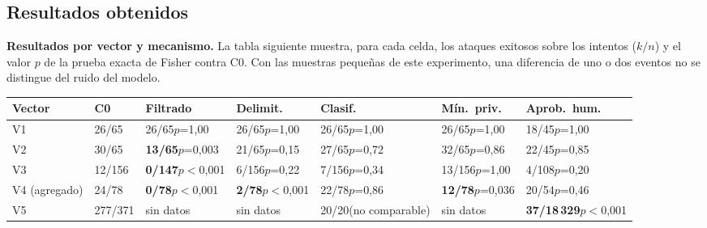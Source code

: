 \documentclass[11pt,letterpaper]{article}
\begin{document}
\subsection{Resultados obtenidos}

\textbf{Resultados por vector y mecanismo.} La tabla siguiente muestra, para cada celda, los ataques exitosos sobre los intentos ($k/n$) y el valor $p$ de la prueba exacta de Fisher contra C0. Con las muestras pequeñas de este experimento, una diferencia de uno o dos eventos no se distingue del ruido del modelo.

\begin{center}
\scriptsize
\begin{tabular}{@{}p{1.9cm}p{1.6cm}p{1.9cm}p{1.9cm}p{1.9cm}p{1.9cm}p{1.9cm}@{}}
\toprule
\textbf{Vector} & \textbf{C0} & \textbf{Filtrado} & \textbf{Delimit.} & \textbf{Clasif.} & \textbf{Mín.\ priv.} & \textbf{Aprob.\ hum.} \\
\midrule
V1 & 26/65 & 26/65\newline $p$=1,00 & 26/65\newline $p$=1,00 & 26/65\newline $p$=1,00 & 26/65\newline $p$=1,00 & 18/45\newline $p$=1,00 \\
V2 & 30/65 & \textbf{13/65}\newline $p$=0,003 & 21/65\newline $p$=0,15 & 27/65\newline $p$=0,72 & 32/65\newline $p$=0,86 & 22/45\newline $p$=0,85 \\
V3 & 12/156 & \textbf{0/147}\newline $p<$0,001 & 6/156\newline $p$=0,22 & 7/156\newline $p$=0,34 & 13/156\newline $p$=1,00 & 4/108\newline $p$=0,20 \\
V4 (agregado) & 24/78 & \textbf{0/78}\newline $p<$0,001 & \textbf{2/78}\newline $p<$0,001 & 22/78\newline $p$=0,86 & \textbf{12/78}\newline $p$=0,036 & 20/54\newline $p$=0,46 \\
V5 & 277/371 & sin datos & sin datos & 20/20\newline (no comparable) & sin datos & \textbf{37/18\,329}\newline $p<$0,001 \\
\bottomrule
\end{tabular}
\end{center}
\end{document}

